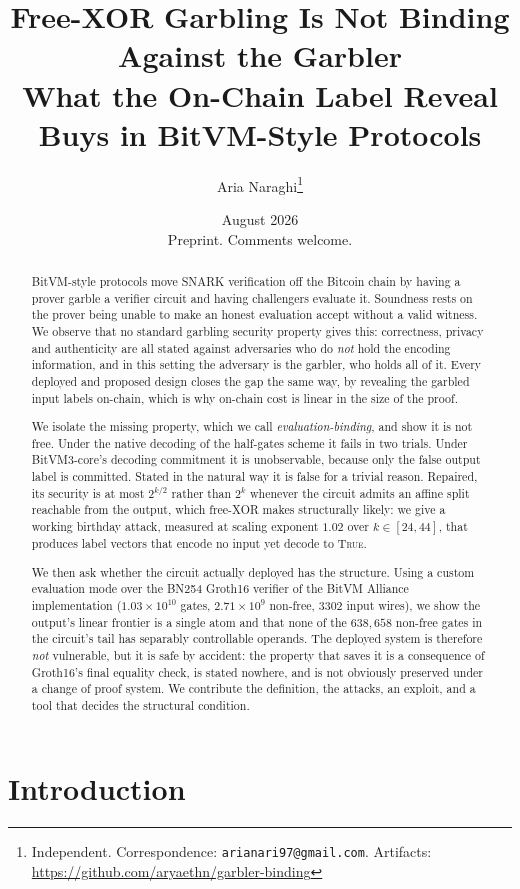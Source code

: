 \documentclass[11pt,a4paper]{article}
\title{\bf Free-XOR Garbling Is Not Binding Against the Garbler\\[0.4em]
\large What the On-Chain Label Reveal Buys in BitVM-Style Protocols}
\author{Aria Naraghi\thanks{Independent. Correspondence: \texttt{arianari97@gmail.com}.
Artifacts: \url{https://github.com/aryaethn/garbler-binding}}}
\date{August 2026 \\[0.3em] \small Preprint. Comments welcome.}
\theoremstyle{definition}
\theoremstyle{plain}
\begin{document}
\maketitle

\begin{abstract}
BitVM-style protocols move SNARK verification off the Bitcoin chain by having a
prover garble a verifier circuit and having challengers evaluate it. Soundness
rests on the prover being unable to make an honest evaluation accept without a
valid witness. We observe that no standard garbling security property gives
this: correctness, privacy and authenticity are all stated against adversaries
who do \emph{not} hold the encoding information, and in this setting the
adversary is the garbler, who holds all of it. Every deployed and proposed
design closes the gap the same way, by revealing the garbled input labels
on-chain, which is why on-chain cost is linear in the size of the proof.

We isolate the missing property, which we call \emph{evaluation-binding}, and
show it is not free. Under the native decoding of the half-gates scheme it fails
in two trials. Under BitVM3-core's decoding commitment it is unobservable,
because only the false output label is committed. Stated in the natural way it
is false for a trivial reason. Repaired, its security is at most $2^{k/2}$
rather than $2^{k}$ whenever the circuit admits an affine split reachable from
the output, which free-XOR makes structurally likely: we give a working birthday
attack, measured at scaling exponent $1.02$ over $k \in [24,44]$, that produces
label vectors that encode no input yet decode to \textsc{True}.

We then ask whether the circuit actually deployed has the structure. Using a
custom evaluation mode over the BN254 Groth16 verifier of the BitVM Alliance
implementation ($1.03 \times 10^{10}$ gates, $2.71 \times 10^{9}$ non-free,
$3302$ input wires), we show the output's linear frontier is a single atom and
that none of the $638{,}658$ non-free gates in the circuit's tail has separably
controllable operands. The deployed system is therefore \emph{not} vulnerable,
but it is safe by accident: the property that saves it is a consequence of
Groth16's final equality check, is stated nowhere, and is not obviously
preserved under a change of proof system. We contribute the definition, the
attacks, an exploit, and a tool that decides the structural condition.
\end{abstract}

\section{Introduction}
\end{document}

